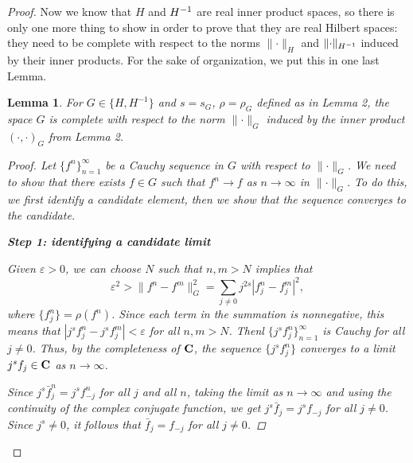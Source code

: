 \documentclass{homework}
\newtheorem{lemma}{Lemma}
\begin{document}
\begin{arabicparts}
\begin{proof}
		Now we know that $H$ and ${H^{-1}}$ are real inner product spaces, so there is only one more thing to show in order to prove that they are real Hilbert spaces: they need to be complete with respect to the norms $\lVert\cdot\rVert_H$ and $\lVert\cdot\rVert_{H^{-1}}$ induced by their inner products. For the sake of organization, we put this in one last Lemma.
		
		\begin{lemma}
			For $G \in \{H,H^{-1}\}$ and $s = s_G$, $\rho = \rho_G$ defined as in Lemma 2, the space $G$ is complete with respect to the norm $\lVert\cdot\rVert_G$ induced by the inner product $(\cdot,\cdot)_G$ from Lemma 2.
			
			\begin{proof}
				Let $\{f^n\}_{n=1}^\infty$ be a Cauchy sequence in $G$ with respect to $\lVert \cdot \rVert_G$. We need to show that there exists $f\in G$ such that $f^n \to f$ as $n \to \infty$ in $\lVert \cdot\rVert_G$. To do this, we first identify a candidate element, then we show that the sequence converges to the candidate.
				
				\textbf{Step 1: identifying a candidate limit}
				
				Given $\varepsilon > 0$, we can choose $N$ such that $n,m > N$ implies that
				\begin{equation}
					\varepsilon^2 > \lVert f^n - f^m\rVert_G^2 = \sum_{j\ne0}j^{2s}|f^n_j - f^m_j|^2,
				\end{equation}
				where $\{f^n_j\} = \rho(f^n)$. Since each term in the summation is nonnegative, this means that $|j^sf^n_j - j^sf^m_j| < \varepsilon$ for all $n, m > N$. Thenl $\{j^sf^n_j\}_{n=1}^\infty$ is Cauchy for all $j \ne 0$. Thus, by the completeness of $\textbf{C}$, the sequence $\{j^sf^n_j\}$ converges to a limit $j^sf_j \in \textbf{C}$ as $n \to\infty$.
				
				\newcommand{\idx}{\mathcal{J}_J}
				Since $j^s\bar{f}^n_j = j^sf^n_{-j}$ for all $j$ and all $n$, taking the limit as $n \to \infty$ and using the continuity of the complex conjugate function, we get $j^s\bar{f}_j = j^sf_{-j}$ for all $j\ne0$. Since $j^s \ne 0$, it follows that $\bar{f}_j = f_{-j}$ for all $j\ne 0$.
				

\end{proof}
\end{lemma}
\end{proof}
\end{arabicparts}
\end{document}
